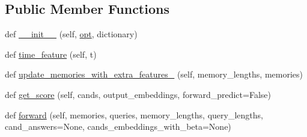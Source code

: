 \subsection*{Public Member Functions}
\begin{DoxyCompactItemize}
\item 
def \hyperlink{classagent_1_1modules_1_1MemNN_afa7eea8fb77c75602a7b58afce74f31c}{\+\_\+\+\_\+init\+\_\+\+\_\+} (self, \hyperlink{classagent_1_1modules_1_1MemNN_acade9312ce9292bf44d4e1b70c8f9b73}{opt}, dictionary)
\item 
def \hyperlink{classagent_1_1modules_1_1MemNN_a1464c9a427996709f4a910a7b2d2487d}{time\+\_\+feature} (self, t)
\item 
def \hyperlink{classagent_1_1modules_1_1MemNN_a7f640b99845db4db6508e12e139e3b22}{update\+\_\+memories\+\_\+with\+\_\+extra\+\_\+features\+\_\+} (self, memory\+\_\+lengths, memories)
\item 
def \hyperlink{classagent_1_1modules_1_1MemNN_a830d84e09fae11dac5df4cbf8225bd26}{get\+\_\+score} (self, cands, output\+\_\+embeddings, forward\+\_\+predict=False)
\item 
def \hyperlink{classagent_1_1modules_1_1MemNN_aa4fbd692135afd7ec2fa94afafe34b73}{forward} (self, memories, queries, memory\+\_\+lengths, query\+\_\+lengths, cand\+\_\+answers=None, cands\+\_\+embeddings\+\_\+with\+\_\+beta=None)
\end{DoxyCompactItemize}
